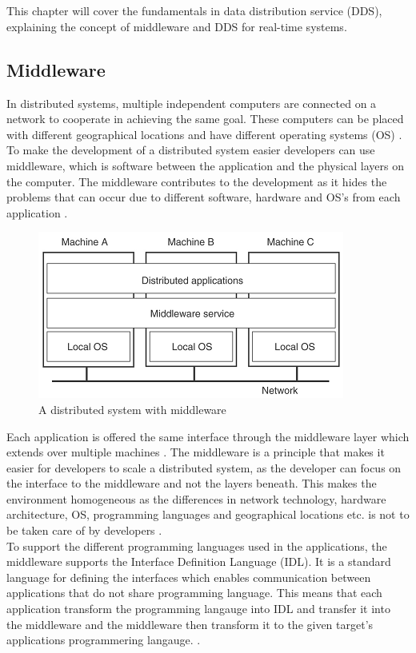 \documentclass[Main]{subfiles}
\begin{document}
\chapter{}
This chapter will cover the fundamentals in data distribution service (DDS), explaining the concept of middleware and DDS for real-time systems.
\\
\section{Middleware}
In distributed systems, multiple independent computers are connected on a network to cooperate in achieving the same goal. These computers can be placed with different geographical locations and have different operating systems (OS) \cite[p. 2]{Tanenbaum}.
\\ To make the development of a distributed system easier developers can use middleware, which is software between the application and the physical layers on the computer. The middleware contributes to the development as it hides the problems that can occur due to different software, hardware and OS's from each application \cite[p. 3]{Tanenbaum}.

\begin{figure}[H]
\centering
\includegraphics[scale=1]{Figure/Middleware.png}
\caption{A distributed system with middleware \cite[p. 3]{Tanenbaum}}
\label{Fig:Middleware}
\end{figure}

Each application is offered the same interface through the middleware layer which extends over multiple machines \cite[p. 3]{Tanenbaum}. The middleware is a principle that makes it easier for developers to scale a distributed system, as the developer can focus on the interface to the middleware and not the layers beneath. This makes the environment homogeneous as the differences in network technology, hardware architecture, OS, programming languages and geographical locations etc. is not to be taken care of by developers \cite{DDS-slides} \cite[p. 68]{Coulouris}.
\\
To support the different programming languages used in the applications, the middleware supports the Interface Definition Language (IDL). It is a standard language for defining the interfaces which enables communication between applications that do not share programming language. This means that each application transform the programming langauge into IDL and transfer it into the middleware and the middleware then transform it to the given target's applications programmering langauge. \cite{DDS-slides} \cite{RTI} \cite{wiki-idl}.
\end{document}
